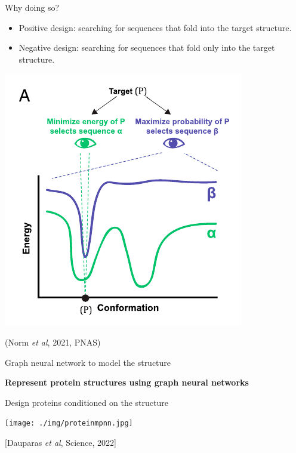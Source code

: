 \documentclass[presentation,smaller]{beamer}
\begin{document}
\begin{frame}[label={sec:orgb0a8693}]{Why doing so?}
\begin{itemize}
\item Positive design: searching for sequences that fold into the target structure.
\item Negative design: searching for sequences that fold \alert{only} into the target structure.
\end{itemize}

\begin{center}
\includegraphics[scale=0.7]{./img/af_landscape_optimization.png}
\end{center}

(Norm \emph{et al}, 2021, PNAS)
\end{frame}

\begin{frame}[label={sec:orga37b14a}]{Graph neural network to model the structure}
\begin{center}
\Large \textbf{Represent protein structures using graph neural networks}
\end{center}
\end{frame}
\begin{frame}[label={sec:orgacd4d39}]{Design proteins conditioned on the structure}
\begin{center}
\texttt{[image: ./img/proteinmpnn.jpg]}
\end{center}
[Dauparas \emph{et al}, Science, 2022]
\end{frame}
\end{document}
